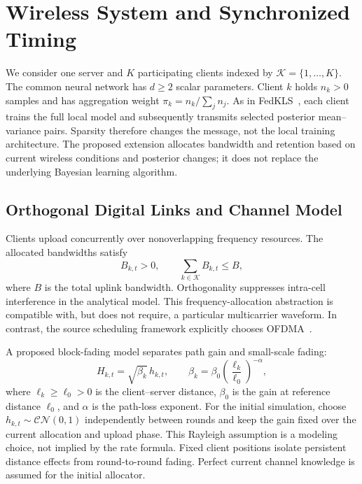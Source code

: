 \section{Wireless System and Synchronized Timing}
\label{sec:system}
We consider one server and $K$ participating clients indexed by $\mathcal K=\{1,\ldots,K\}$. The common neural network has $d\ge2$ scalar parameters. Client $k$ holds $n_k>0$ samples and has aggregation weight $\pi_k=n_k/\sum_j n_j$. As in FedKLS~\cite{fedkls}, each client trains the full local model and subsequently transmits selected posterior mean--variance pairs. Sparsity therefore changes the message, not the local training architecture. The proposed extension allocates bandwidth and retention based on current wireless conditions and posterior changes; it does not replace the underlying Bayesian learning algorithm.

\subsection{Orthogonal Digital Links and Channel Model}
Clients upload concurrently over nonoverlapping frequency resources. The allocated bandwidths satisfy
\begin{equation}
 B_{k,t}>0,\qquad \sum_{k\in\mathcal K}B_{k,t}\le B,
 \label{eq:bandwidth-budget}
\end{equation}
where $B$ is the total uplink bandwidth. Orthogonality suppresses intra-cell interference in the analytical model. This frequency-allocation abstraction is compatible with, but does not require, a particular multicarrier waveform. In contrast, the source scheduling framework explicitly chooses OFDMA~\cite[Sec.~II-C]{scheduling}.

A proposed block-fading model separates path gain and small-scale fading:
\begin{equation}
 H_{k,t}=\sqrt{\beta_k}\,h_{k,t},\qquad
 \beta_k=\beta_0\left(\frac{\ell_k}{\ell_0}\right)^{-\alpha},
 \label{eq:channel}
\end{equation}
where $\ell_k\ge\ell_0>0$ is the client--server distance, $\beta_0$ is the gain at reference distance $\ell_0$, and $\alpha$ is the path-loss exponent. For the initial simulation, choose $h_{k,t}\sim\mathcal{CN}(0,1)$ independently between rounds and keep the gain fixed over the current allocation and upload phase. This Rayleigh assumption is a modeling choice, not implied by the rate formula. Fixed client positions isolate persistent distance effects from round-to-round fading. Perfect current channel knowledge is assumed for the initial allocator.


